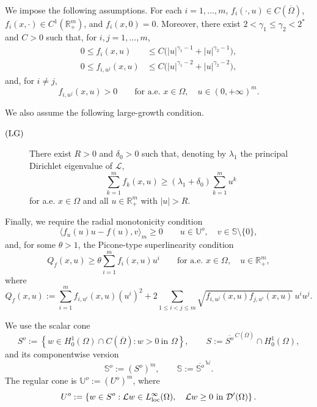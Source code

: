 \documentclass[preprint,10pt]{elsarticle}
\numberwithin{equation}{section}
\begin{document}
We impose the following assumptions. For each \(i=1,\ldots,m\),
\(f_i(\cdot,u)\in C(\overline\Omega)\),
\(f_i(x,\cdot)\in C^1(\mathbb R_+^m)\), and \(f_i(x,0)=0\). Moreover, there
exist \(2<\gamma_1\le\gamma_2<2^*\) and \(C>0\) such that, for
\(i,j=1,\ldots,m\),
\begin{align}
	0\le f_i(x,u)
	&\le
	C\bigl(|u|^{\gamma_1-1}+|u|^{\gamma_2-1}\bigr),
	\label{42}
	\\
	0\le f_{i,u^j}(x,u)
	&\le
	C\bigl(|u|^{\gamma_1-2}+|u|^{\gamma_2-2}\bigr),
	\label{422}
\end{align}
and, for \(i\ne j\),
\[
f_{i,u^j}(x,u)>0
\qquad
\text{for a.e. }x\in\Omega,\quad u\in(0,+\infty)^m .
\]

We also assume the following large-growth condition.

\begin{description}
	\item[\({\rm (LG)}\)]
	There exist \(R>0\) and \(\delta_0>0\) such that, denoting by
	\(\lambda_1\) the principal Dirichlet eigenvalue of \(\mathcal L\),
	\[
	\sum_{k=1}^m f_k(x,u)
	\ge
	(\lambda_1+\delta_0)\sum_{k=1}^m u^k
	\]
	for a.e. \(x\in\Omega\) and all \(u\in\mathbb R_+^m\) with \(|u|>R\).
\end{description}

Finally, we require the radial monotonicity condition
\begin{equation}
	\label{eq:radial-monotonicity-f}
	\bigl\langle f_u(u)u-f(u),v\bigr\rangle_m\ge0
	\qquad
	u\in\mathbb U^o,\quad v\in\mathbb S\setminus\{0\},
\end{equation}
and, for some \(\theta>1\), the Picone-type superlinearity condition
\begin{equation}
	\label{eq:picone-superlinearity-f}
	Q_f(x,u)\ge \theta\sum_{i=1}^m f_i(x,u)u^i
	\qquad
	\text{for a.e. }x\in\Omega,\quad u\in\mathbb R_+^m,
\end{equation}
where
\[
Q_f(x,u):=
\sum_{i=1}^m f_{i,u^i}(x,u)(u^i)^2
+
2\sum_{1\le i<j\le m}
\sqrt{f_{i,u^j}(x,u)f_{j,u^i}(x,u)}\,u^iu^j .
\]

We use the scalar cone
\[
S^o
:=
\left\{
w\in H_0^1(\Omega)\cap C(\overline\Omega):
w>0 \ \text{in }\Omega
\right\},
\qquad
S:=\overline{S^o}^{\,C(\overline\Omega)}\cap H_0^1(\Omega),
\]
and its componentwise version
\[
\mathbb S^o:=(S^o)^m,
\qquad
\mathbb S:=\overline{\mathbb S^o}^{\,\mathbb W}.
\]
The regular cone is \(\mathbb U^o:=(U^o)^m\), where
\[
U^o
:=
\left\{
w\in S^o:
\mathcal Lw\in L^\infty_{\rm loc}(\Omega),
\quad
\mathcal Lw\ge0
\text{ in }\mathcal D'(\Omega)
\right\}.
\]
\end{document}
